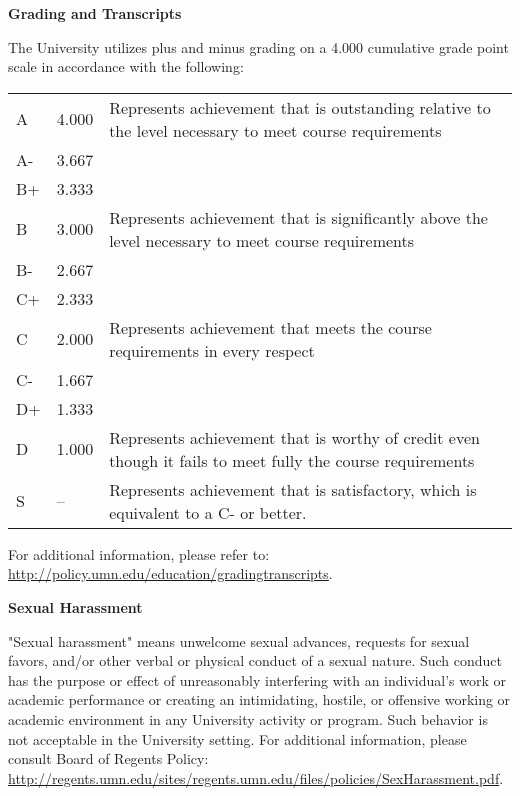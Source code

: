 \documentclass[11pt]{article}
\begin{document}
\vspace{10pt}
\noindent\textbf{Grading and Transcripts}

\hspace{3mm}
The University utilizes plus and minus grading on a 4.000 cumulative grade point scale in accordance with the following:

\begin{centering}
\begin{tabular}{p{.05\linewidth}p{.1\linewidth}p{.65\linewidth}}
\hline
A	&	4.000 & Represents achievement that is outstanding relative to the level necessary to meet course requirements \\
A-	&	3.667 & \\
B+	&	3.333 & \\
B	&	3.000 & Represents achievement that is significantly above the level necessary to meet course requirements \\
B-	&	2.667 & \\
C+	&	2.333 & \\
C	&	2.000 & Represents achievement that meets the course requirements in every respect \\
C-	&	1.667 & \\
D+	&	1.333 & \\
D	&	1.000 & Represents achievement that is worthy of credit even though it fails to meet fully the course requirements \\
S	&	--    & Represents achievement that is satisfactory, which is equivalent to a C- or better. \\
\hline
\end{tabular}
\end{centering}
\vspace{10pt}

For additional information, please refer to: \url{http://policy.umn.edu/education/gradingtranscripts}.

\vspace{10pt}
\noindent\textbf{Sexual Harassment}

\hspace{3mm}
"Sexual harassment" means unwelcome sexual advances, requests for sexual favors, and/or other verbal or physical conduct of a sexual nature. Such conduct has the purpose or effect of unreasonably interfering with an individual's work or academic performance or creating an intimidating, hostile, or offensive working or academic environment in any University activity or program. Such behavior is not acceptable in the University setting. For additional information, please consult Board of Regents Policy: \url{http://regents.umn.edu/sites/regents.umn.edu/files/policies/SexHarassment.pdf}.
\end{document}
